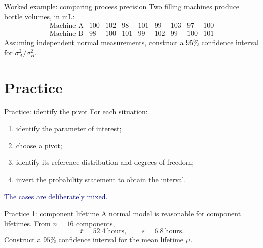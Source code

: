 \documentclass[aspectratio=169,11pt]{beamer}
\begin{document}
\begin{frame}{Worked example: comparing process precision}
  Two filling machines produce bottle volumes, in mL:
  \[
    \begin{array}{c|cccccccc}
      \text{Machine A} &100&102&98&101&99&103&97&100\\
      \text{Machine B} &98&100&101&99&102&99&100&101
    \end{array}
  \]
  Assuming independent normal measurements, construct a $95\%$ confidence interval for
  $\sigma_A^2/\sigma_B^2$.

\end{frame}

\section{Practice}

\begin{frame}{Practice: identify the pivot}
  For each situation:
  \begin{enumerate}
    \item identify the parameter of interest;
    \item choose a pivot;
    \item identify its reference distribution and degrees of freedom;
    \item invert the probability statement to obtain the interval.
  \end{enumerate}
  \vfill
  \centering
  \textcolor{navy}{\large The cases are deliberately mixed.}
\end{frame}

\begin{frame}{Practice 1: component lifetime}
  A normal model is reasonable for component lifetimes. From $n=16$ components,
  \[
    \bar x=52.4\ \text{hours},\qquad s=6.8\ \text{hours}.
  \]
  Construct a $95\%$ confidence interval for the mean lifetime $\mu$.

\end{frame}
\end{document}
